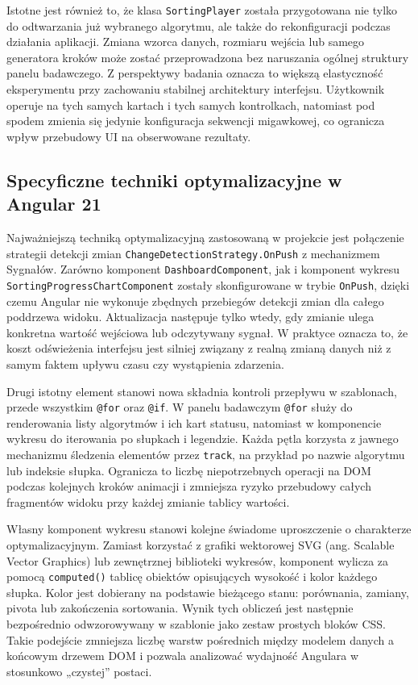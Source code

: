 \documentclass[12pt,openright,twoside]{report}
\begin{document}
Istotne jest również to, że klasa \texttt{SortingPlayer} została przygotowana nie tylko do odtwarzania już wybranego algorytmu, ale także do rekonfiguracji podczas działania aplikacji. Zmiana wzorca danych, rozmiaru wejścia lub samego generatora kroków może zostać przeprowadzona bez naruszania ogólnej struktury panelu badawczego. Z perspektywy badania oznacza to większą elastyczność eksperymentu przy zachowaniu stabilnej architektury interfejsu. Użytkownik operuje na tych samych kartach i tych samych kontrolkach, natomiast pod spodem zmienia się jedynie konfiguracja sekwencji migawkowej, co ogranicza wpływ przebudowy UI na obserwowane rezultaty.

\subsection{Specyficzne techniki optymalizacyjne w Angular 21}
Najważniejszą techniką optymalizacyjną zastosowaną w projekcie jest połączenie strategii detekcji zmian \texttt{ChangeDetectionStrategy.OnPush} z mechanizmem Sygnałów. Zarówno komponent \texttt{DashboardComponent}, jak i komponent wykresu \texttt{SortingProgressChartComponent} zostały skonfigurowane w trybie \texttt{OnPush}, dzięki czemu Angular nie wykonuje zbędnych przebiegów detekcji zmian dla całego poddrzewa widoku. Aktualizacja następuje tylko wtedy, gdy zmianie ulega konkretna wartość wejściowa lub odczytywany sygnał. W praktyce oznacza to, że koszt odświeżenia interfejsu jest silniej związany z realną zmianą danych niż z samym faktem upływu czasu czy wystąpienia zdarzenia.

Drugi istotny element stanowi nowa składnia kontroli przepływu w szablonach, przede wszystkim \texttt{@for} oraz \texttt{@if}. W panelu badawczym \texttt{@for} służy do renderowania listy algorytmów i ich kart statusu, natomiast w komponencie wykresu do iterowania po słupkach i legendzie. Każda pętla korzysta z jawnego mechanizmu śledzenia elementów przez \texttt{track}, na przykład po nazwie algorytmu lub indeksie słupka. Ogranicza to liczbę niepotrzebnych operacji na DOM podczas kolejnych kroków animacji i zmniejsza ryzyko przebudowy całych fragmentów widoku przy każdej zmianie tablicy wartości.

Własny komponent wykresu stanowi kolejne świadome uproszczenie o charakterze optymalizacyjnym. Zamiast korzystać z grafiki wektorowej SVG (ang. Scalable Vector Graphics) lub zewnętrznej biblioteki wykresów, komponent wylicza za pomocą \texttt{computed()} tablicę obiektów opisujących wysokość i kolor każdego słupka. Kolor jest dobierany na podstawie bieżącego stanu: porównania, zamiany, pivota lub zakończenia sortowania. Wynik tych obliczeń jest następnie bezpośrednio odwzorowywany w szablonie jako zestaw prostych bloków CSS. Takie podejście zmniejsza liczbę warstw pośrednich między modelem danych a końcowym drzewem DOM i pozwala analizować wydajność Angulara w stosunkowo „czystej” postaci.
\end{document}
